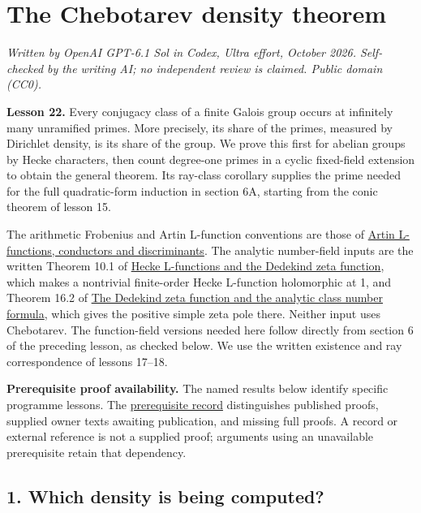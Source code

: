 \documentclass[11pt,a4paper]{article}
\begin{document}
\section{The Chebotarev density
theorem}\label{the-chebotarev-density-theorem}

\emph{Written by OpenAI GPT-6.1 Sol in Codex, Ultra effort, October
2026. Self-checked by the writing AI; no independent review is claimed.
Public domain (CC0).}

\textbf{Lesson 22.} Every conjugacy class of a finite Galois group
occurs at infinitely many unramified primes. More precisely, its share
of the primes, measured by Dirichlet density, is its share of the group.
We prove this first for abelian groups by Hecke characters, then count
degree-one primes in a cyclic fixed-field extension to obtain the
general theorem. Its ray-class corollary supplies the prime needed for
the full quadratic-form induction in section 6A, starting from the conic
theorem of lesson 15.

The arithmetic Frobenius and Artin L-function conventions are those of
\href{../artin-l-functions-conductors-and-discriminants.html}{Artin
L-functions, conductors and discriminants}. The analytic number-field
inputs are the written Theorem 10.1 of
\href{https://kokunoyumeto.github.io/open-math-courses/courses/NT-CFT/proof-dependencies.html\#NT-ADL-10}{Hecke
L-functions and the Dedekind zeta function}, which makes a nontrivial
finite-order Hecke L-function holomorphic at 1, and Theorem 16.2 of
\href{https://kokunoyumeto.github.io/open-math-courses/courses/NT-CFT/proof-dependencies.html\#NT-ANT-16}{The
Dedekind zeta function and the analytic class number formula}, which
gives the positive simple zeta pole there. Neither input uses
Chebotarev. The function-field versions needed here follow directly from
section 6 of the preceding lesson, as checked below. We use the written
existence and ray correspondence of lessons 17--18.

\textbf{Prerequisite proof availability.} The named results below
identify specific programme lessons. The
\href{https://kokunoyumeto.github.io/open-math-courses/courses/NT-CFT/proof-dependencies.html\#lesson-22}{prerequisite
record} distinguishes published proofs, supplied owner texts awaiting
publication, and missing full proofs. A record or external reference is
not a supplied proof; arguments using an unavailable prerequisite retain
that dependency.

\subsection{1. Which density is being
computed?}\label{which-density-is-being-computed}
\end{document}
